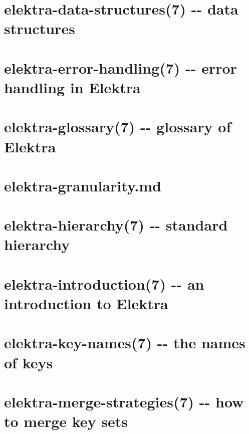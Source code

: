\documentclass[twoside]{book}
\newcommand{\+}{\discretionary{\mbox{\scriptsize$\hookleftarrow$}}{}{}}
\begin{document}
\chapter{elektra-\/data-\/structures(7) -\/-\/ data structures}
\label{md_doc_help_elektra-data-structures}
\hypertarget{md_doc_help_elektra-data-structures}{}

\chapter{elektra-\/error-\/handling(7) -\/-\/ error handling in Elektra}
\label{md_doc_help_elektra-error-handling}
\hypertarget{md_doc_help_elektra-error-handling}{}

\chapter{elektra-\/glossary(7) -\/-\/ glossary of Elektra}
\label{md_doc_help_elektra-glossary}
\hypertarget{md_doc_help_elektra-glossary}{}

\chapter{elektra-\/granularity.md}
\label{doc_help_elektra-granularity_md}
\hypertarget{doc_help_elektra-granularity_md}{}

\chapter{elektra-\/hierarchy(7) -\/-\/ standard hierarchy}
\label{md_doc_help_elektra-hierarchy}
\hypertarget{md_doc_help_elektra-hierarchy}{}

\chapter{elektra-\/introduction(7) -\/-\/ an introduction to Elektra}
\label{md_doc_help_elektra-introduction}
\hypertarget{md_doc_help_elektra-introduction}{}

\chapter{elektra-\/key-\/names(7) -\/-\/ the names of keys}
\label{md_doc_help_elektra-key-names}
\hypertarget{md_doc_help_elektra-key-names}{}

\chapter{elektra-\/merge-\/strategies(7) -\/-\/ how to merge key sets}
\label{md_doc_help_elektra-merge-strategy}
\hypertarget{md_doc_help_elektra-merge-strategy}{}

\end{document}
